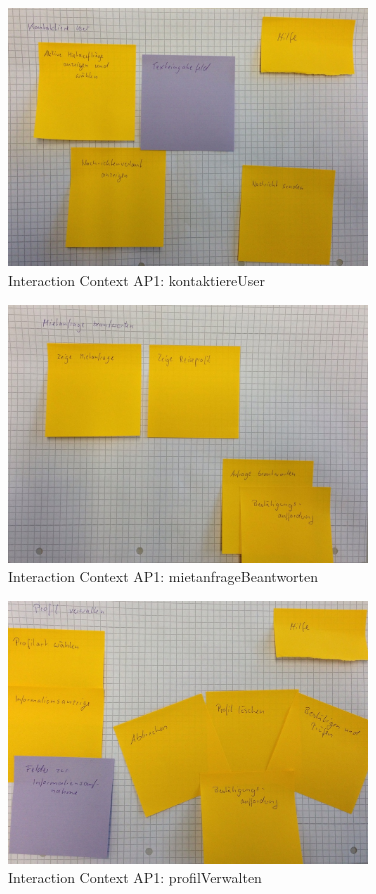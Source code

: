 \begin{figure}[H]
\centering
\includegraphics[width=0.85\textwidth]{./images/abstract/version1/kontaktiereUser.JPG}
\caption{Interaction Context AP1: kontaktiereUser}
\label{interfaceContents25}
\end{figure}


\begin{figure}[H]
\centering
\includegraphics[width=0.85\textwidth]{./images/abstract/version1/mietanfrageBeantworten.JPG}
\caption{Interaction Context AP1: mietanfrageBeantworten}
\label{interfaceContents26}
\end{figure}

\begin{figure}[H]
\centering
\includegraphics[width=0.85\textwidth]{./images/abstract/version1/profilVerwalten.JPG}
\caption{Interaction Context AP1: profilVerwalten}
\label{interfaceContents27}
\end{figure}


